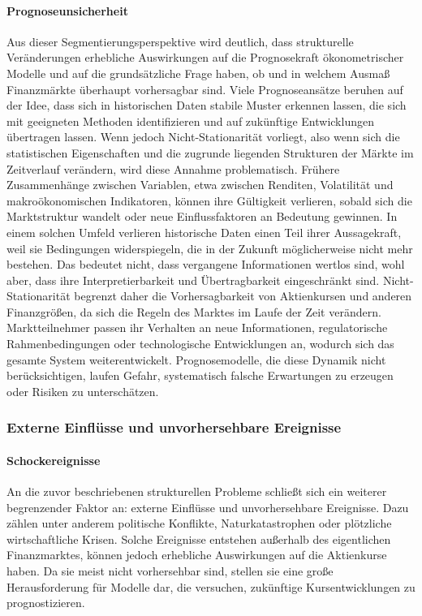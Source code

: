 \paragraph{Prognoseunsicherheit}
Aus dieser Segmentierungsperspektive wird deutlich, dass strukturelle Veränderungen erhebliche Auswirkungen auf die Prognosekraft ökonometrischer Modelle und auf die grundsätzliche Frage haben, ob und in welchem Ausmaß Finanzmärkte überhaupt vorhersagbar sind. Viele Prognoseansätze beruhen auf der Idee, dass sich in historischen Daten stabile Muster erkennen lassen, die sich mit geeigneten Methoden identifizieren und auf zukünftige Entwicklungen übertragen lassen. Wenn jedoch Nicht-Stationarität vorliegt, also wenn sich die statistischen Eigenschaften und die zugrunde liegenden Strukturen der Märkte im Zeitverlauf verändern, wird diese Annahme problematisch. Frühere Zusammenhänge zwischen Variablen, etwa zwischen Renditen, Volatilität und makroökonomischen Indikatoren, können ihre Gültigkeit verlieren, sobald sich die Marktstruktur wandelt oder neue Einflussfaktoren an Bedeutung gewinnen. In einem solchen Umfeld verlieren historische Daten einen Teil ihrer Aussagekraft, weil sie Bedingungen widerspiegeln, die in der Zukunft möglicherweise nicht mehr bestehen. Das bedeutet nicht, dass vergangene Informationen wertlos sind, wohl aber, dass ihre Interpretierbarkeit und Übertragbarkeit eingeschränkt sind. Nicht-Stationarität begrenzt daher die Vorhersagbarkeit von Aktienkursen und anderen Finanzgrößen, da sich die Regeln des Marktes im Laufe der Zeit verändern. Marktteilnehmer passen ihr Verhalten an neue Informationen, regulatorische Rahmenbedingungen oder technologische Entwicklungen an, wodurch sich das gesamte System weiterentwickelt. Prognosemodelle, die diese Dynamik nicht berücksichtigen, laufen Gefahr, systematisch falsche Erwartungen zu erzeugen oder Risiken zu unterschätzen. \cite{Procacci_Thesis}

\subsubsection{Externe Einflüsse und unvorhersehbare Ereignisse}
\paragraph{Schockereignisse}
An die zuvor beschriebenen strukturellen Probleme schließt sich ein weiterer begrenzender Faktor an: externe Einflüsse und unvorhersehbare Ereignisse. Dazu zählen unter anderem politische Konflikte, Naturkatastrophen oder plötzliche wirtschaftliche Krisen. Solche Ereignisse entstehen außerhalb des eigentlichen Finanzmarktes, können jedoch erhebliche Auswirkungen auf die Aktienkurse haben. Da sie meist nicht vorhersehbar sind, stellen sie eine große Herausforderung für Modelle dar, die versuchen, zukünftige Kursentwicklungen zu prognostizieren.

